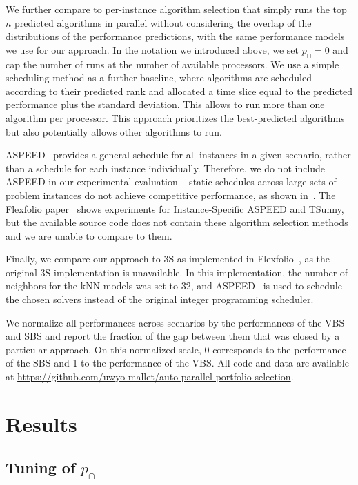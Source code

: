 We further compare to per-instance algorithm selection that simply runs the top $n$ predicted algorithms in parallel without considering the overlap of the distributions of the performance predictions, with the same performance models we use for our approach. In the notation we introduced above, we set $p_{\cap}=0$ and cap the number of runs at the number of available processors. 
We use a simple scheduling method as a further baseline, where algorithms are scheduled according to their predicted rank and allocated a time slice equal to the predicted performance plus the standard deviation. This allows to run more than one algorithm per processor. This approach prioritizes the best-predicted algorithms but also potentially allows other algorithms to run.

ASPEED~\cite{aspeed} provides a general schedule for all instances in a given scenario, rather than a schedule for each instance individually. Therefore, we do not include ASPEED in our experimental evaluation -- static schedules across large sets of problem instances do not achieve competitive performance, as shown in~\cite{flexfolio}. The Flexfolio paper~\cite{flexfolio} shows experiments for Instance-Specific ASPEED and TSunny, but the available source code does not contain these algorithm selection methods and we are unable to compare to them.

Finally, we compare our approach to 3S as implemented in Flexfolio~\cite{flexfolio}, as the original 3S implementation is unavailable. In this implementation, the number of neighbors for the kNN models was set to 32, and ASPEED~\cite{aspeed} is used to schedule the chosen solvers instead of the original integer programming scheduler.

We normalize all performances across scenarios by the performances of the VBS and SBS and report the fraction of the gap between them that was closed by a particular approach. On this normalized scale, 0 corresponds to the performance of the SBS and 1 to the performance of the VBS.
All code and data are available at \url{https://github.com/uwyo-mallet/auto-parallel-portfolio-selection}.

\section{Results}
\subsection{Tuning of $p_{\cap}$}

